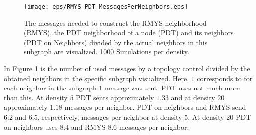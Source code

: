 \begin{figure}[h!]
\centering
\texttt{[image: eps/RMYS\_PDT\_MessagesPerNeighbors.eps]}
\caption{The messages needed to construct the RMYS neighborhood (RMYS), the PDT neighborhood of a node (PDT) and its neighbors (PDT on Neighbors) divided by the actual neighbors in this subgraph are visualized. 1000 Simulations per density.}
\label{fig:RMYS_PDT_MessagesPerNeighbors}
\end{figure}

In Figure \ref{fig:RMYS_PDT_MessagesPerNeighbors} is the number of used messages by a topology control divided by the obtained neighbors in the specific subgraph visualized.
Here, $1 $ corresponds to for each neighbor in the subgraph $1 $ message was sent.
PDT uses not much more than this.
At density $5 $ PDT sents approximately $1.33$ and at density $20 $ approximately $1.18 $ messages per neighbor.
PDT on neighbors and RMYS send $6.2 $ and $6.5 $, respectively, messages per neighbor at density $5 $.
At density $20 $ PDT on neighbors uses $8.4 $ and RMYS $8.6 $ messages per neighbor.




